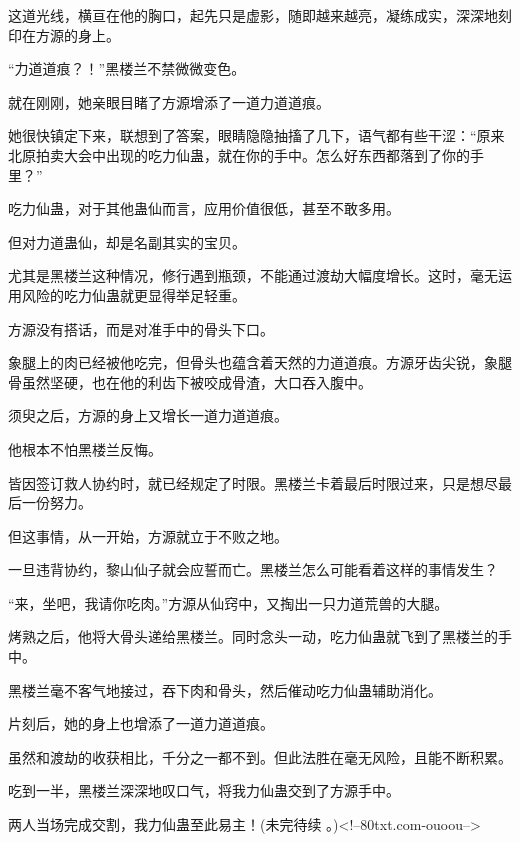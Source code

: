 \begin{this_body}
这道光线，横亘在他的胸口，起先只是虚影，随即越来越亮，凝练成实，深深地刻印在方源的身上。

“力道道痕？！”黑楼兰不禁微微变色。

就在刚刚，她亲眼目睹了方源增添了一道力道道痕。

她很快镇定下来，联想到了答案，眼睛隐隐抽搐了几下，语气都有些干涩：“原来北原拍卖大会中出现的吃力仙蛊，就在你的手中。怎么好东西都落到了你的手里？”

吃力仙蛊，对于其他蛊仙而言，应用价值很低，甚至不敢多用。

但对力道蛊仙，却是名副其实的宝贝。

尤其是黑楼兰这种情况，修行遇到瓶颈，不能通过渡劫大幅度增长。这时，毫无运用风险的吃力仙蛊就更显得举足轻重。

方源没有搭话，而是对准手中的骨头下口。

象腿上的肉已经被他吃完，但骨头也蕴含着天然的力道道痕。方源牙齿尖锐，象腿骨虽然坚硬，也在他的利齿下被咬成骨渣，大口吞入腹中。

须臾之后，方源的身上又增长一道力道道痕。

他根本不怕黑楼兰反悔。

皆因签订救人协约时，就已经规定了时限。黑楼兰卡着最后时限过来，只是想尽最后一份努力。

但这事情，从一开始，方源就立于不败之地。

一旦违背协约，黎山仙子就会应誓而亡。黑楼兰怎么可能看着这样的事情发生？

“来，坐吧，我请你吃肉。”方源从仙窍中，又掏出一只力道荒兽的大腿。

烤熟之后，他将大骨头递给黑楼兰。同时念头一动，吃力仙蛊就飞到了黑楼兰的手中。

黑楼兰毫不客气地接过，吞下肉和骨头，然后催动吃力仙蛊辅助消化。

片刻后，她的身上也增添了一道力道道痕。

虽然和渡劫的收获相比，千分之一都不到。但此法胜在毫无风险，且能不断积累。

吃到一半，黑楼兰深深地叹口气，将我力仙蛊交到了方源手中。

两人当场完成交割，我力仙蛊至此易主！(未完待续 。)<!--80txt.com-ouoou-->

\end{this_body}

